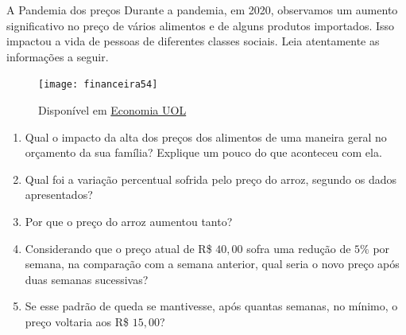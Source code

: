 \begin{task}{A Pandemia dos preços}
Durante a pandemia, em 2020, observamos um aumento significativo no preço de vários alimentos e de alguns produtos importados. Isso impactou a vida de pessoas de diferentes classes sociais. Leia atentamente as informações a seguir.

\begin{figure}[H]
\centering

\texttt{[image: financeira54]}
\caption{Disponível em \href{https://economia.uol.com.br/noticias/redacao/2020/09/08/preco-do-arroz-dispara.html}{Economia UOL}}
\label{}
\end{figure}

\begin{enumerate}
\item Qual o impacto da alta dos preços dos alimentos de uma maneira geral no orçamento da sua família? Explique um pouco do que aconteceu com ela.
\item Qual foi a variação percentual sofrida pelo preço do arroz, segundo os dados apresentados?
\item Por que o preço do arroz aumentou tanto?
\item Considerando que o preço atual de R\$ $40{,}00$ sofra uma redução de $5\%$ por semana, na comparação com a semana anterior, qual seria o novo preço após duas semanas sucessivas?
\item Se esse padrão de queda se mantivesse, após quantas semanas, no mínimo, o preço voltaria aos R\$ $15{,}00$?
\end{enumerate}
\end{task}


